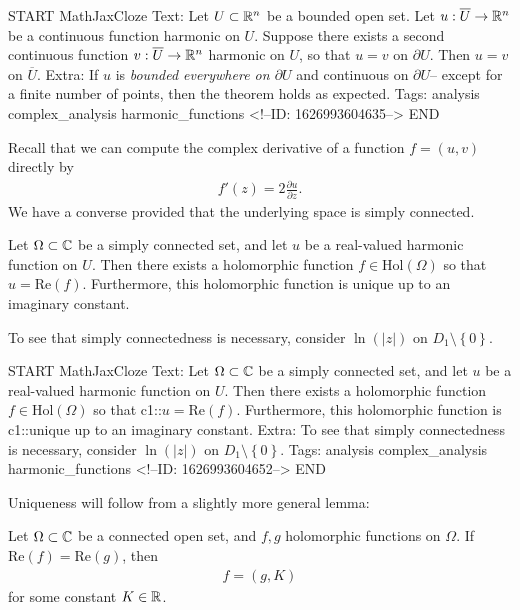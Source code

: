\documentclass{memoir}
\begin{document}
\begin{anki}
START
MathJaxCloze
Text: Let \(U\subset \mathbb{R}^n\) be a bounded open set. Let \(u:\overline{U}\to \mathbb{R}^{n}\) be a continuous function harmonic on \(U\). Suppose there exists a second continuous function \(v:\overline{U}\to \mathbb{R}^{n}\) harmonic on \(U\), so that \(u = v\) on \(\partial U\). Then \(u=v\) on \(\overline{U}\).
Extra: If \(u\) is \textit{bounded everywhere on \(\partial U\)} and continuous on \(\partial U\)-- except for a finite number of points, then the theorem holds as expected.
Tags: analysis complex_analysis harmonic_functions
<!--ID: 1626993604635-->
END
\end{anki}

Recall that we can compute the complex derivative of a function \(f=(u,v)\) directly by
\begin{align*}
	f'(z) = 2 \frac{\partial u}{\partial z} .
\end{align*}
We have a converse provided that the underlying space is simply connected.
 \begin{prop}
	 Let \(\Omega \subset \mathbb{C}\) be a simply connected set, and let \(u\) be a real-valued harmonic function on \(U\). Then there exists a holomorphic function \(f \in \textrm{Hol}(\Omega )\) so that \(u= \textrm{Re}(f)\). Furthermore, this holomorphic function is unique up to an imaginary constant.
\end{prop}
To see that simply connectedness is necessary, consider \(\ln(\left| z \right| )\) on \(D_1 \setminus\left\{ 0 \right\} \).
\begin{anki}
START
MathJaxCloze
Text: Let \(\Omega \subset \mathbb{C}\) be a simply connected set, and let \(u\) be a real-valued harmonic function on \(U\). Then there exists a holomorphic function \(f \in \textrm{Hol}(\Omega )\) so that {{c1::\(u= \textrm{Re}(f)\)}}. Furthermore, this holomorphic function is {{c1::unique up to an imaginary constant}}.
Extra: To see that simply connectedness is necessary, consider \(\ln(\left| z \right| )\) on \(D_1 \setminus\left\{ 0 \right\} \).
Tags: analysis complex_analysis harmonic_functions
<!--ID: 1626993604652-->
END
\end{anki}
Uniqueness will follow from a slightly more general lemma:
\begin{lemma}
	Let \(\Omega \subset \mathbb{C}\) be a connected open set, and \(f,g\) holomorphic functions on \(\Omega \). If \(\textrm{Re}(f) = \textrm{Re}(g)\), then
	\begin{align*}
		f = (g, K)
	\end{align*}
	for some constant \(K \in \mathbb{R}\).
\end{lemma}
\end{document}
